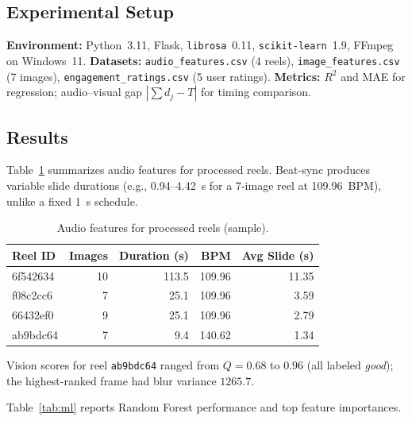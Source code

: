 \documentclass{article}
\begin{document}
\subsection{Experimental Setup}

\textbf{Environment:} Python~3.11, Flask, \texttt{librosa}~0.11, \texttt{scikit-learn}~1.9, FFmpeg on Windows~11.
\textbf{Datasets:} \texttt{audio\_features.csv} (4 reels), \texttt{image\_features.csv} (7 images), \texttt{engagement\_ratings.csv} (5 user ratings).
\textbf{Metrics:} $R^2$ and MAE for regression; audio--visual gap $|\sum d_j - T|$ for timing comparison.

\subsection{Results}

Table~\ref{tab:audio} summarizes audio features for processed reels.
Beat-sync produces variable slide durations (e.g., 0.94--4.42~s for a 7-image reel at 109.96~BPM), unlike a fixed 1~s schedule.

\begin{table}[t]
\centering
\caption{Audio features for processed reels (sample).}
\label{tab:audio}
\scriptsize
\begin{tabular}{l r r r r}
\toprule
\textbf{Reel ID} & \textbf{Images} & \textbf{Duration (s)} & \textbf{BPM} & \textbf{Avg Slide (s)} \\
\midrule
6f542634 & 10 & 113.5 & 109.96 & 11.35 \\
f08c2cc6 &  7 &  25.1 & 109.96 &  3.59 \\
66432ef0 &  9 &  25.1 & 109.96 &  2.79 \\
ab9bdc64 &  7 &   9.4 & 140.62 &  1.34 \\
\bottomrule
\end{tabular}
\end{table}

Vision scores for reel \texttt{ab9bdc64} ranged from $Q = 0.68$ to $0.96$ (all labeled \emph{good}); the highest-ranked frame had blur variance $1265.7$.

Table~\ref{tab:ml} reports Random Forest performance and top feature importances.
\end{document}
